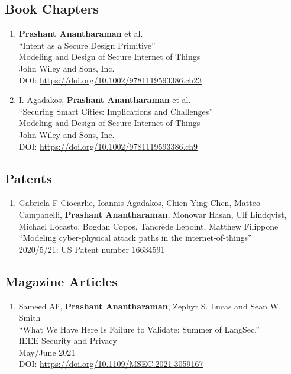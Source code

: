 \documentclass[letterpaper,10pt]{article}
\begin{document}
\subsection*{\color{dartmouthgreen} Book Chapters}
\begin{enumerate}[label={B\arabic*.}]
  \setlength\itemsep{0ex}


  \item {\bf Prashant Anantharaman} et al.\\
    ``Intent as a Secure Design Primitive''\\
    Modeling and Design of Secure Internet of Things\\
    John Wiley and Sons, Inc.\\
    DOI: \url{https://doi.org/10.1002/9781119593386.ch23}

  \item  I. Agadakos, {\bf Prashant Anantharaman} et al. \\
    ``Securing Smart Cities: Implications and Challenges''\\
    Modeling and Design of Secure Internet of Things\\
    John Wiley and Sons, Inc.\\
    DOI: \url{https://doi.org/10.1002/9781119593386.ch9}


\end{enumerate}

\subsection*{\color{dartmouthgreen} Patents}
\begin{enumerate}[label={P\arabic*.}]
\setlength\itemsep{0ex}
\item Gabriela F Ciocarlie, Ioannis Agadakos, Chien-Ying Chen, Matteo Campanelli, {\bf Prashant Anantharaman}, Monowar Hasan, Ulf Lindqvist, Michael Locasto, Bogdan Copos, Tancrède Lepoint, Matthew Filippone \\
  ``Modeling cyber-physical attack paths in the internet-of-things'' \\
  2020/5/21: US Patent number 16634591
\end{enumerate}

\subsection*{\color{dartmouthgreen} Magazine Articles}
\begin{enumerate}[label={M\arabic*.}]
\setlength\itemsep{0ex}
  \item Sameed Ali, {\bf Prashant Anantharaman}, Zephyr S. Lucas and Sean W. Smith\\
``What We Have Here Is Failure to Validate: Summer of LangSec.''\\
IEEE Security and Privacy\\May/June 2021\\
DOI: \url{https://doi.org/10.1109/MSEC.2021.3059167}
\end{enumerate}
\end{document}
